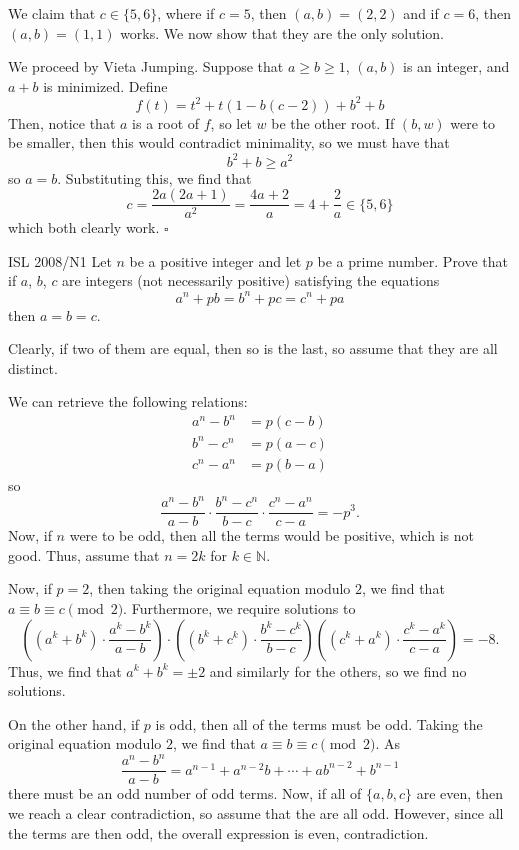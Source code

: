 \documentclass{article}
\begin{document}
We claim that $c \in \boxed{\{5, 6\}}$, where if $c = 5$, then $(a, b) = (2, 2)$ and if $c = 6$, then $(a, b) = (1, 1)$ works. We now show that they are the only solution.

We proceed by Vieta Jumping. Suppose that $a \ge b \ge 1$, $(a, b)$ is an integer, and $a+b$ is minimized. Define \[f(t) = t^2+t(1-b(c-2))+b^2+b\] Then, notice that $a$ is a root of $f$, so let $w$ be the other root. If $(b, w)$ were to be smaller, then this would contradict minimality, so we must have that \[b^2+b \ge a^2\] so $a = b$. Substituting this, we find that \[c = \dfrac{2a(2a+1)}{a^2} = \dfrac{4a+2}{a} = 4+\dfrac{2}{a} \in \{5, 6\}\] which both clearly work. $\square$

\begin{problem}[4.9.17]{ISL 2008/N1}
Let $n$ be a positive integer and let $p$ be a prime number. Prove that if $a$, $b$, $c$ are integers (not necessarily positive) satisfying the equations \[a^n+pb = b^n+pc=c^n+pa\] then $a = b = c$.
\end{problem}

Clearly, if two of them are equal, then so is the last, so assume that they are all distinct.

We can retrieve the following relations:
\begin{align*}
a^n-b^n &= p(c-b) \\
b^n-c^n &= p(a-c) \\
c^n-a^n &= p(b-a)
\end{align*}
so \[\dfrac{a^n-b^n}{a-b}\cdot \dfrac{b^n-c^n}{b-c}\cdot \dfrac{c^n-a^n}{c-a} = -p^3.\] Now, if $n$ were to be odd, then all the terms would be positive, which is not good. Thus, assume that $n = 2k$ for $k \in \mathbb{N}$.

Now, if $p = 2$, then taking the original equation modulo $2$, we find that $a \equiv b \equiv c \pmod{2}$. Furthermore, we require solutions to \[\left((a^k+b^k) \cdot \dfrac{a^k-b^k}{a-b}\right)\cdot \left((b^k+c^k) \cdot \dfrac{b^k-c^k}{b-c}\right)\left((c^k+a^k) \cdot \dfrac{c^k-a^k}{c-a}\right) = -8.\] Thus, we find that $a^k+b^k = \pm 2$ and similarly for the others, so we find no solutions.

On the other hand, if $p$ is odd, then all of the terms must be odd. Taking the original equation modulo $2$, we find that $a \equiv b \equiv c \pmod{2}$. As \[\dfrac{a^n-b^n}{a-b} = a^{n-1}+a^{n-2}b+\cdots+ab^{n-2}+b^{n-1}\] there must be an odd number of odd terms. Now, if all of $\{a, b, c\}$ are even, then we reach a clear contradiction, so assume that the are all odd. However, since all the terms are then odd, the overall expression is even, contradiction.
\end{document}
